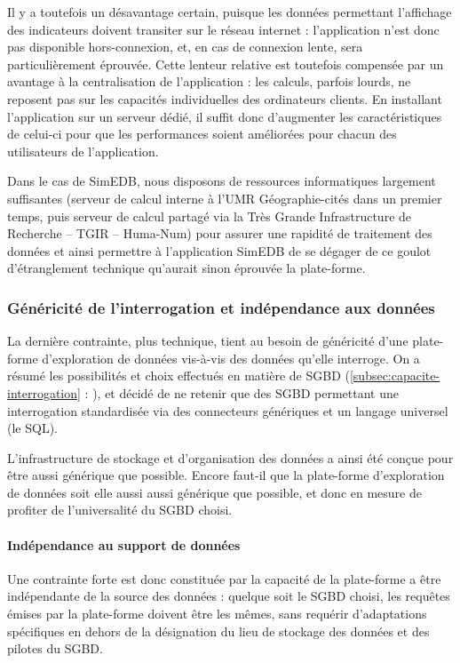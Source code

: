 Il y a toutefois un désavantage certain, puisque les données permettant l'affichage des indicateurs doivent transiter sur le réseau internet : l'application n'est donc pas disponible hors-connexion, et, en cas de connexion lente, sera particulièrement éprouvée.
Cette lenteur relative est toutefois compensée par un avantage à la centralisation de l'application : les calculs, parfois lourds, ne reposent pas sur les capacités individuelles des ordinateurs clients.
En installant l'application sur un serveur dédié, il suffit donc d'augmenter les caractéristiques de celui-ci pour que les performances soient améliorées pour chacun des utilisateurs de l'application.

Dans le cas de SimEDB, nous disposons de ressources informatiques largement suffisantes (serveur de calcul interne à l'UMR Géographie-cités dans un premier temps, puis serveur de calcul partagé via la \og Très Grande Infrastructure de Recherche\fg{} -- TGIR -- Huma-Num) pour assurer une rapidité de traitement des données et ainsi permettre à l'application SimEDB de se dégager de ce \og goulot d'étranglement\fg{} technique qu'aurait sinon éprouvée la plate-forme.

\subsubsection{Généricité de l'interrogation et indépendance aux données}

La dernière contrainte, plus technique, tient au besoin de généricité d'une plate-forme d'exploration de données vis-à-vis des données qu'elle interroge.
On a résumé les possibilités et choix effectués en matière de SGBD (\cref{subsec:capacite-interrogation} :  ), et décidé de ne retenir que des SGBD permettant une interrogation standardisée via des connecteurs génériques et un langage universel (le SQL).

L'infrastructure de stockage et d'organisation des données a ainsi été conçue pour être aussi générique que possible.
Encore faut-il que la plate-forme d'exploration de données soit elle aussi aussi générique que possible, et donc en mesure de profiter de l'universalité du SGBD choisi.

\paragraph*{Indépendance au support de données}
Une contrainte forte est donc constituée par la capacité de la plate-forme a être indépendante de la source des données : quelque soit le SGBD choisi, les requêtes émises par la plate-forme doivent être les mêmes, sans requérir d'adaptations spécifiques en dehors de la désignation du lieu de stockage des données	et des pilotes du SGBD.

